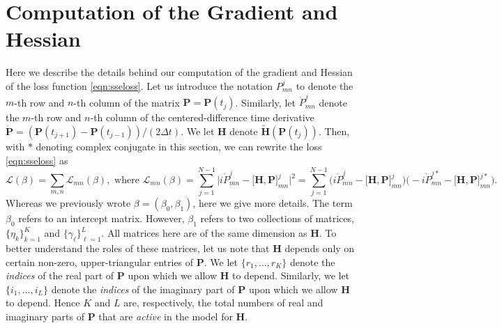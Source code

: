\documentclass[10pt]{article}
\begin{document}
\section{Computation of the Gradient and Hessian}
\label{sect:gradHess}
Here we describe the details behind our computation of the gradient and Hessian of the loss function \eqref{eqn:sseloss}. 
Let us introduce the notation $P^j_{mn}$ to denote the $m$-th row and $n$-th column of the matrix $\mathbf{P} = \mathbf{P}(t_j)$. Similarly, let $\dot{P}^j_{mn}$ denote the $m$-th row and $n$-th column of the centered-difference time derivative $\dot{\mathbf{P}} = (\mathbf{P}(t_{j+1}) - \mathbf{P}(t_{j-1}))/(2 \Delta t)$.  We let $\mathbf{H}$ denote $\widetilde{\mathbf{H}}(\mathbf{P}(t_j))$.  Then, with $\ast$ denoting complex conjugate in this section, we can rewrite the loss \eqref{eqn:sseloss} as
\begin{equation}
\label{eqn:newloss}
\mathcal{L}( \beta ) =  \sum_{m,n} \mathcal{L}_{mn}(\beta), \text{ where } \mathcal{L}_{mn}(\beta) = \sum_{j=1}^{N-1} \biggl| i  \dot{P}^j_{mn}
    -  \big [  \mathbf{H} , \mathbf{P} \big]^j_{mn} \biggr|^2 = \sum_{j=1}^{N-1} \biggl( i  \dot{P}^j_{mn}
    -  \big [  \mathbf{H} , \mathbf{P} \big]^j_{mn} \biggr) \biggl( -i  \dot{P}^{j \ast}_{mn}
    -  \big [  \mathbf{H} , \mathbf{P} \big]^{j \ast}_{mn} \biggr).
\end{equation}
Whereas we previously wrote $\beta = (\beta_0, \beta_1)$, here we give more details.  The term $\beta_0$ refers to an intercept matrix.  However, $\beta_1$ refers to two collections of matrices, $\{\eta_k\}_{k=1}^K$ and $\{\gamma_{\ell}\}_{\ell=1}^L$.  All matrices here are of the same dimension as $\mathbf{H}$.  To better understand the roles of these matrices, let us note that $\mathbf{H}$ depends only on certain non-zero, upper-triangular entries of $\mathbf{P}$.  We let $\{ r_1, \ldots, r_K\}$ denote the \emph{indices} of the real part of $\mathbf{P}$ upon which we allow $\mathbf{H}$ to depend.  Similarly, we let $\{i_1 , \ldots, i_L\}$ denote the \emph{indices} of the imaginary part of $\mathbf{P}$ upon which we allow $\mathbf{H}$ to depend.  Hence $K$ and $L$ are, respectively, the total numbers of real and imaginary parts of $\mathbf{P}$ that are \emph{active} in the model for $\mathbf{H}$.
\end{document}
